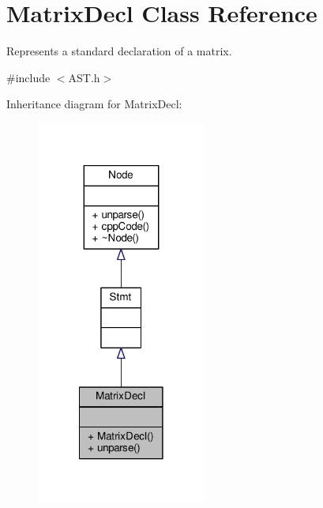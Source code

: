 \hypertarget{classMatrixDecl}{\section{Matrix\-Decl Class Reference}
\label{classMatrixDecl}
}


Represents a standard declaration of a matrix. \par
  




{\ttfamily \#include $<$A\-S\-T.\-h$>$}



Inheritance diagram for Matrix\-Decl\-:\nopagebreak
\begin{figure}[H]
\begin{center}
\leavevmode
\includegraphics[width=158pt]{classMatrixDecl__inherit__graph}
\end{center}
\end{figure}


